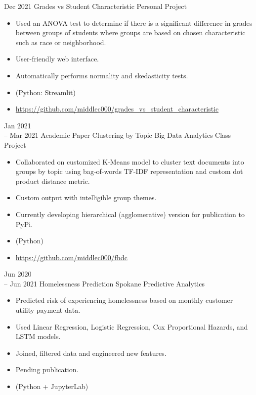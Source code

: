 \documentclass[11pt]{developercv} %
\begin{document}
\begin{entrylist}
	\entry
		{Dec 2021}
		{Grades vs Student Characteristic}
		{Personal Project}
		{\vspace{-0.5cm}\begin{itemize}
			\item Used an ANOVA test to determine if there is a significant difference in grades between groups of students where groups are based on chosen characteristic such as race or neighborhood. 
			\item User-friendly web interface.
			\item Automatically performs normality and skedasticity tests.
			\item (Python: Streamlit)
			\item \url{https://github.com/middlec000/grades_vs_student_characteristic}
		\end{itemize}}
	\entry
		{Jan 2021 \\
		-- Mar 2021}
		{Academic Paper Clustering by Topic}
		{Big Data Analytics Class Project}
		{\vspace{-0.5cm}\begin{itemize}
			\item Collaborated on customized K-Means model to cluster text documents into groups by topic using bag-of-words TF-IDF representation and custom dot product distance metric.
			\item Custom output with intelligible group themes.
			\item Currently developing hierarchical (agglomerative) version for publication to PyPi.
			\item (Python)
			\item \url{https://github.com/middlec000/fhdc}
		\end{itemize}}
	\entry
	    {Jun 2020 \\
		-- Jun 2021}
	    {Homelessness Prediction}
	    {Spokane Predictive Analytics}
		{\vspace{-0.5cm}\begin{itemize}
			\item Predicted risk of experiencing homelessness based on monthly customer utility payment data.
			\item Used Linear Regression, Logistic Regression, Cox Proportional Hazards, and LSTM models.
			\item Joined, filtered data and engineered new features.
			\item Pending publication.
			\item (Python + JupyterLab)

\end{itemize}}
\end{entrylist}
\end{document}
